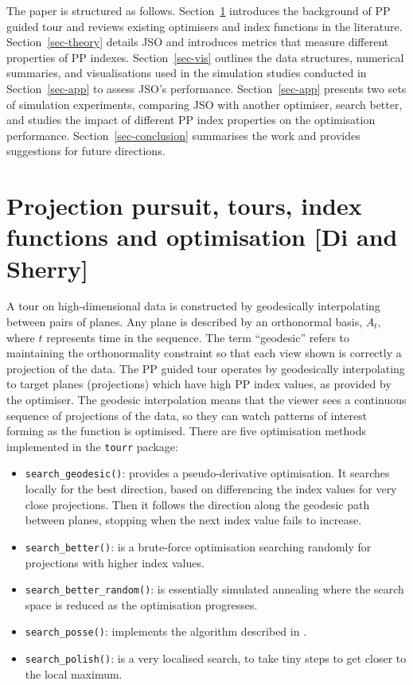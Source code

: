 \documentclass[
  number,
  preprint,
  3p]{elsarticle}
\providecommand{\tightlist}{%
  \setlength{\itemsep}{0pt}\setlength{\parskip}{0pt}}\usepackage{longtable,booktabs,array}
\begin{document}
The paper is structured as follows. Section~\ref{sec-background}
introduces the background of PP guided tour and reviews existing
optimisers and index functions in the literature.
Section~\ref{sec-theory} details JSO and introduces metrics that measure
different properties of PP indexes. Section~\ref{sec-vis} outlines the
data structures, numerical summaries, and visualisations used in the
simulation studies conducted in Section~\ref{sec-app} to assess JSO's
performance. Section~\ref{sec-app} presents two sets of simulation
experiments, comparing JSO with another optimiser, search better, and
studies the impact of different PP index properties on the optimisation
performance. Section~\ref{sec-conclusion} summarises the work and
provides suggestions for future directions.

\section{Projection pursuit, tours, index functions and optimisation
{[}Di and Sherry{]}}\label{sec-background}

A tour on high-dimensional data is constructed by geodesically
interpolating between pairs of planes. Any plane is described by an
orthonormal basis, \(A_t\), where \(t\) represents time in the sequence.
The term ``geodesic'' refers to maintaining the orthonormality
constraint so that each view shown is correctly a projection of the
data. The PP guided tour operates by geodesically interpolating to
target planes (projections) which have high PP index values, as provided
by the optimiser. The geodesic interpolation means that the viewer sees
a continuous sequence of projections of the data, so they can watch
patterns of interest forming as the function is optimised. There are
five optimisation methods implemented in the \texttt{tourr} package:

\begin{itemize}
\tightlist
\item
  \texttt{search\_geodesic()}: provides a pseudo-derivative
  optimisation. It searches locally for the best direction, based on
  differencing the index values for very close projections. Then it
  follows the direction along the geodesic path between planes, stopping
  when the next index value fails to increase.
\item
  \texttt{search\_better()}: is a brute-force optimisation searching
  randomly for projections with higher index values.
\item
  \texttt{search\_better\_random()}: is essentially simulated annealing
  \citep{Bertsimas93} where the search space is reduced as the
  optimisation progresses.
\item
  \texttt{search\_posse()}: implements the algorithm described in
  \citet{posse95}.
\item
  \texttt{search\_polish()}: is a very localised search, to take tiny
  steps to get closer to the local maximum.
\end{itemize}
\end{document}

